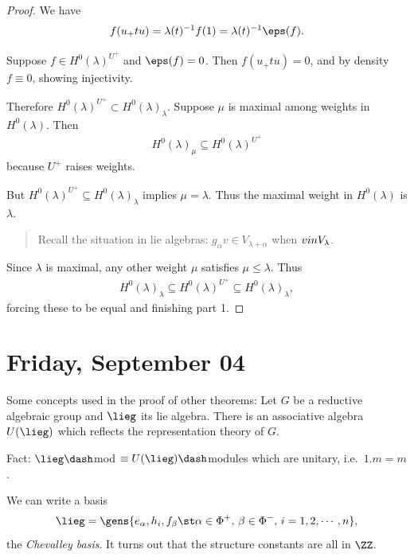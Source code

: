 \begin{proof}

We have
\begin{align*}  
f(u_+ t u) = \lambda(t)^{-1} f(1) = \lambda(t)^{-1} \eps(f)
.\end{align*}

Suppose \(f\in H^0(\lambda)^{U^+}\) and \(\eps(f) = 0\). Then
\(f(u_+ t u) = 0\), and by density \(f\equiv 0\), showing injectivity.

Therefore \(H^0(\lambda)^{U^+}\subset H^0(\lambda)_\lambda\). Suppose
\(\mu\) is maximal among weights in \(H^0(\lambda)\). Then
\begin{align*}  
H^0(\lambda)_{\mu} \subseteq H^0(\lambda)^{U^+}
\end{align*} because \(U^+\) raises weights.

But \(H^0(\lambda)^{U^+} \subseteq H^0(\lambda)_\lambda\) implies
\(\mu = \lambda\). Thus the maximal weight in \(H^0(\lambda)\) is
\(\lambda\).

\begin{quote}
Recall the situation in lie algebras:
\(g_\alpha v \in V_{\lambda + \alpha}\) when \(v\\in V_{\lambda}\).
\end{quote}

Since \(\lambda\) is maximal, any other weight \(\mu\) satisfies
\(\mu \leq \lambda\). Thus
\begin{align*}  
H^0(\lambda)_\lambda \subseteq H^0(\lambda)^{U^+} \subseteq H^0(\lambda)_\lambda
,\end{align*} forcing these to be equal and finishing part 1.

\end{proof}

\hypertarget{friday-september-04}{%
\section{Friday, September 04}\label{friday-september-04}}

Some concepts used in the proof of other theorems: Let \(G\) be a
reductive algebraic group and \(\lieg\) its lie algebra. There is an
associative algebra \(U(\lieg)\) which reflects the representation
theory of \(G\).

Fact: \(\lieg\dash\)mod \(\equiv U(\lieg)\dash\)modules which are
unitary, i.e.~\(1.m = m\).

We can write a basis
\begin{align*}  
\lieg  = \gens{e_\alpha, h_i, f_\beta \st \alpha\in\Phi^+,\, \beta\in\Phi^-,\, i = 1,2,\cdots,n}
,\end{align*} the \emph{Chevalley basis}. It turns out that the
structure constants are all in \(\ZZ\).

